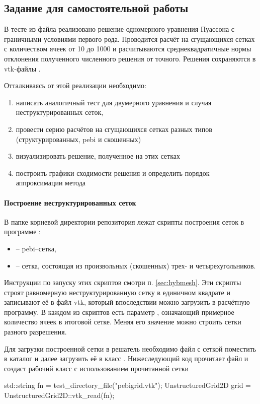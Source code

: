 \subsection{Задание для самостоятельной работы}
\label{sec:hw_fvm2d}
В тесте  из файла 
реализовано решение одномерного уравнения Пуассона с граничными условиями первого рода.
Проводится расчёт на сгущающихся сетках с количеством ячеек от 10 до 1000
и расчитываются среднеквадратичные нормы отклонения полученного численного решения от точного.
Решения сохраняются в vtk-файлы .



Отталкиваясь от этой реализации необходимо:
\begin{enumerate}
\item написать аналогичный тест для двумерного уравнения и случая неструктурированных сеток,
\item провести серию расчётов на сгущающихся сетках разных типов (структурированных, pebi и скошенных)
\item визуализировать решение, полученное на этих сетках
\item построить графики сходимости решения и определить порядок аппроксимации метода
\end{enumerate}

\paragraph{Построение неструктурированных сеток}
В папке  корневой директории репозитория
лежат скрипты построения сеток в программе :
\begin{itemize}
\item {} -- pebi--сетка,
\item {} -- сетка, состоящая из произвольных (скошенных) трех- и четырехугольников.
\end{itemize}
Инструкции по запуску этих скриптов смотри п. \ref{sec:hybmesh}.
Эти скрипты строят равномерную неструктурированную сетку
в единичном квадрате
и записывают её в файл vtk, который впоследствии можно загрузить
в расчётную программу.
В каждом из скриптов есть параметр , означающий
примерное количество ячеек в итоговой сетке.
Меняя его значение можно строить сетки разного разрешения.

Для загрузки построенной сетки в решатель необходимо файл
с сеткой поместить в каталог 
и далее загрузить её в класс .
Нижеследующий код прочитает файл 
и создаст рабочий класс с использованием прочитанной сетки
\begin{cppcode}
std::string fn = test_directory_file("pebigrid.vtk");
UnstructuredGrid2D grid = UnstructuredGrid2D::vtk_read(fn);
\end{cppcode}


